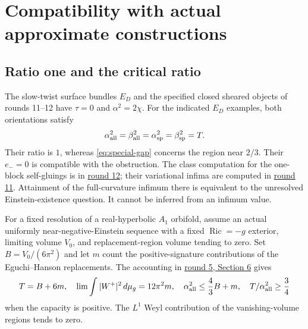\documentclass[11pt,a4paper]{article}
\theoremstyle{definition}
\theoremstyle{remark}
\DeclareMathOperator{\Ric}{Ric}
\newcommand{\dd}{\,d\mu_g}
\newcommand{\roundref}[2]{\href{run:../references/rounds/#1}{#2}}
\numberwithin{equation}{section}
\begin{document}
\section{Compatibility with actual approximate constructions}\label{sec:compatibility}
\subsection{Ratio one and the critical ratio}\label{sub:ratios}
The slow-twist surface bundles $E_D$ and the specified closed sheared
objects of rounds 11--12 have $\tau=0$ and $\alpha^2=2\chi$.
For the indicated $E_D$ examples, both orientations satisfy
\[
 \alpha_{\rm all}^2=\beta_{\rm all}^2
 =\alpha_{\rm sp}^2=\beta_{\rm sp}^2=T.
\]
Their ratio is $1$, whereas \eqref{eq:special-gap} concerns the region
near $2/3$. Their $e_-=0$ is compatible with the obstruction.
The class computation for the one-block self-gluings is in
\roundref{round12_global.md}{round 12}; their variational infima are
computed in \roundref{round11_variational.md}{round 11}. Attainment of
the full-curvature infimum there is equivalent to the unresolved
Einstein-existence question. It cannot be inferred from an infimum value.

For a fixed resolution of a real-hyperbolic $A_1$ orbifold, assume an
actual uniformly near-negative-Einstein sequence with a fixed
$\Ric=-g$ exterior, limiting volume $V_0$, and replacement-region
volume tending to zero. Set $B=V_0/(6\pi^2)$ and let $m$ count the
positive-signature contributions of the Eguchi--Hanson replacements.
The accounting in \roundref{round5_rigidity.md}{round 5, Section 6} gives
\[
 T=B+6m,\quad\lim\int|W^+|^2\dd=12\pi^2m,
 \quad\alpha_{\rm all}^2\le\frac43B+m,
 \quad T/\alpha_{\rm all}^2\ge\frac34
\]
when the capacity is positive. The $L^1$ Weyl contribution of the
vanishing-volume regions tends to zero.
\end{document}
